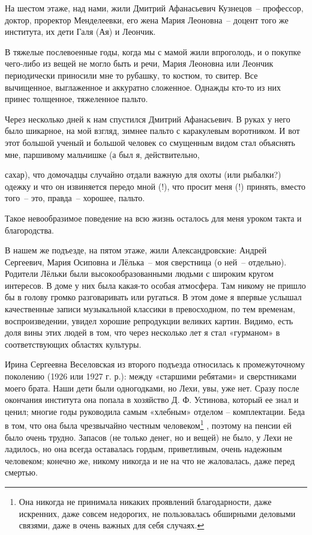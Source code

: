 На шестом этаже, над нами, жили Дмитрий Афанасьевич Кузнецов~-- профессор, доктор, проректор Менделеевки, его жена Мария Леоновна~-- доцент того же института, их дети Галя (Ая) и Леончик.



В тяжелые послевоенные годы, когда мы с мамой жили впроголодь, и о покупке чего-либо из вещей не могло быть  и  речи,  Мария Леоновна или Леончик периодически приносили мне то рубашку, то костюм, то свитер. Все вычищенное, выглаженное и аккуратно сложенное. Однажды кто-то из них принес толщенное, тяжеленное пальто.

Через несколько дней к нам спустился Дмитрий Афанасьевич. В руках у него было шикарное, на мой взгляд, зимнее пальто с каракулевым воротником. И вот этот большой ученый и большой человек со смущенным видом стал объяснять мне, паршивому мальчишке (а был я, действительно, 




\restoregeometry

 сахар), что домочадцы случайно отдали важную для охоты (или рыбалки?) одежку и что он извиняется передо мной (!), что просит меня (!) принять, вместо того~-- это, правда~-- хорошее, пальто.



Такое невообразимое поведение на всю жизнь осталось для меня уроком такта и благородства.

\indent

В нашем же подъезде, на пятом этаже, жили Александровские: Андрей Сергеевич, Мария Осиповна и Лёлька~-- моя сверстница (о ней~-- отдельно). Родители Лёльки были высокообразованными людьми с широким кругом интересов. В доме у них была какая-то особая атмосфера. Там никому не пришло бы в голову громко разговаривать или ругаться. В этом доме я впервые услышал качественные записи музыкальной классики в превосходном, по тем временам, воспроизведении, увидел хорошие репродукции великих картин. Видимо, есть доля вины этих людей в том, что через несколько лет я стал «гурманом» в соответствующих областях культуры.

\indent

Ирина Сергеевна Веселовская из второго подъезда относилась к промежуточному поколению (1926 или 1927 г. р.): между «старшими ребятами» и сверстниками моего брата. Наши дети были одногодками, но Лехи, увы, уже нет. Сразу после окончания института она попала в хозяйство Д. Ф. Устинова, который ее знал и ценил; многие годы руководила самым «хлебным» отделом – комплектации. Беда в том, что она была чрезвычайно честным человеком\protect\footnote{Она никогда не принимала никаких проявлений благодарности, даже искренних, даже совсем недорогих, не пользовалась обширными деловыми связями, даже в очень важных для себя случаях.} , поэтому на пенсии ей было очень трудно. Запасов (не только денег, но и вещей) не было, у Лехи не ладилось, но она всегда оставалась гордым, приветливым, очень надежным человеком; конечно же, никому никогда и не на что не жаловалась, даже перед смертью. 

